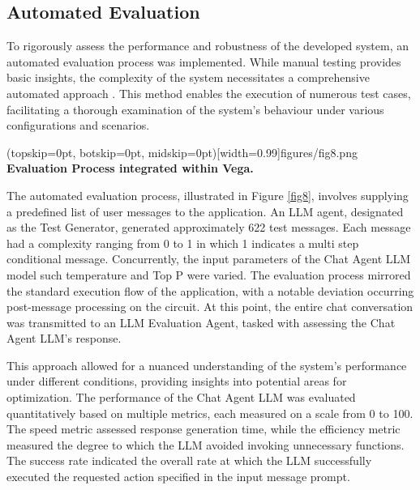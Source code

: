 \documentclass{ieeeaccess}
\begin{document}
\subsection{Automated Evaluation}
To rigorously assess the performance and robustness of the developed system, an automated evaluation process was implemented. While manual testing provides basic insights, the complexity of the system necessitates a comprehensive automated approach \cite{1290484}. This method enables the execution of numerous test cases, facilitating a thorough examination of the system's behaviour under various configurations and scenarios.

\Figure[t!](topskip=0pt, botskip=0pt, midskip=0pt)[width=0.99\columnwidth]{{figures/fig8.png}}
{ \textbf{Evaluation Process integrated within Vega.}\label{fig8}}

The automated evaluation process, illustrated in Figure \ref{fig8}, involves supplying a predefined list of user messages to the application. An LLM agent, designated as the Test Generator, generated approximately 622 test messages. Each message had a complexity ranging from 0 to 1 in which 1 indicates a multi step conditional message. Concurrently, the input parameters of the Chat Agent LLM model such temperature and Top P \cite{rum2024setting} were varied. The evaluation process mirrored the standard execution flow of the application, with a notable deviation occurring post-message processing on the circuit. At this point, the entire chat conversation was transmitted to an LLM Evaluation Agent, tasked with assessing the Chat Agent LLM's response. 

This approach allowed for a nuanced understanding of the system's performance under different conditions, providing insights into potential areas for optimization. The performance of the Chat Agent LLM was evaluated quantitatively based on multiple metrics, each measured on a scale from 0 to 100. The speed metric assessed response generation time, while the efficiency metric measured the degree to which the LLM avoided invoking unnecessary functions. The success rate indicated the overall rate at which the LLM successfully executed the requested action specified in the input message prompt.
\end{document}
